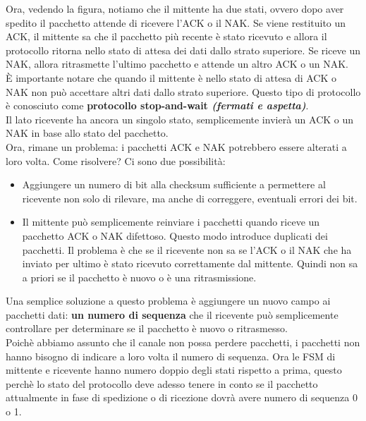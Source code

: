 \documentclass[11pt,a4paper]{book}
\begin{document}
Ora, vedendo la figura, notiamo che il mittente ha due stati, ovvero dopo aver spedito il pacchetto attende di ricevere l'ACK o il NAK. Se viene restituito un ACK, il mittente sa che il pacchetto più recente è stato ricevuto e allora il protocollo ritorna nello stato di attesa dei dati dallo strato superiore. Se riceve un NAK, allora ritrasmette l'ultimo pacchetto e attende un altro ACK o un NAK. \\
È importante notare che quando il mittente è nello stato di attesa di ACK o NAK non può accettare altri dati dallo strato superiore. Questo tipo di protocollo è conosciuto come \textbf{protocollo stop-and-wait \textit{(fermati e aspetta)}}. \\
Il lato ricevente ha ancora un singolo stato, semplicemente invierà un ACK o un NAK in base allo stato del pacchetto. \\
Ora, rimane un problema: i pacchetti ACK e NAK potrebbero essere alterati a loro volta. Come risolvere? Ci sono due possibilità:
\begin{itemize}
	\item Aggiungere un numero di bit alla checksum sufficiente a permettere al ricevente non solo di rilevare, ma anche di correggere, eventuali errori dei bit.
	\item Il mittente può semplicemente reinviare i pacchetti quando riceve un pacchetto ACK o NAK difettoso. Questo modo introduce duplicati dei pacchetti. Il problema è che se il ricevente non sa se l'ACK o il NAK che ha inviato per ultimo è stato ricevuto correttamente dal mittente. Quindi non sa a priori se il pacchetto è nuovo o è una ritrasmissione.
\end{itemize}
Una semplice soluzione a questo problema è aggiungere un nuovo campo ai pacchetti dati: \textbf{un numero di sequenza} che il ricevente può semplicemente controllare per determinare se il pacchetto è nuovo o ritrasmesso. \\
Poichè abbiamo assunto che il canale non possa perdere pacchetti, i pacchetti non hanno bisogno di indicare a loro volta il numero di sequenza. Ora le FSM di mittente e ricevente hanno numero doppio degli stati rispetto a prima, questo perchè lo stato del protocollo deve adesso tenere in conto se il pacchetto attualmente in fase di spedizione o di ricezione dovrà avere numero di sequenza 0 o 1. \pagebreak
\end{document}
